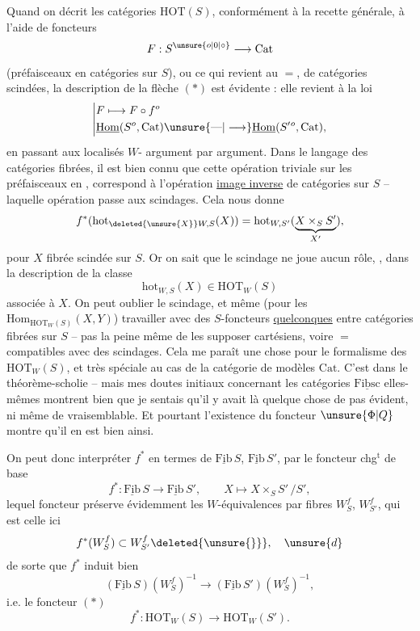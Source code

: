 Quand on décrit les catégories $\mathrm{HOT}(S)$, conformément à la recette générale, à l'aide de  foncteurs
\[
F:S^{\unsure{o|0|\circ}}\longrightarrow\mathrm{Cat}
\]
(préfaisceaux en catégories sur $S$), ou ce qui revient au $=$, de catégories scindées, la description de la  flèche $(*)$ est évidente : elle revient à la loi
\[
\left|\begin{aligned}
&F\longmapsto F\circ f^o\\
&\underline{\mathrm{Hom}}(S^o,\mathrm{Cat})\unsure{\text{---}|\longrightarrow}\underline{\mathrm{Hom}}(S'{}^o,\mathrm{Cat}),
\end{aligned}\right.
\]
en passant aux localisés  $W$- argument par argument. Dans le langage des catégories fibrées, il est bien connu que cette opération triviale sur les préfaisceaux en , correspond à l'opération \uline{image inverse} de catégories sur $S$ -- laquelle opération passe aux scindages.
Cela nous donne 
\[
f^*(\mathrm{hot}_{\deleted{\unsure{X}}W,S}(X))=\mathrm{hot}_{W,S'}(\underbrace{X\times_S S'}_{X'}),
\]
pour  $X$ fibrée scindée sur $S$. Or on sait que le scindage  ne joue aucun rôle, , dans la description de la classe
\[
\mathrm{hot}_{W,S}(X)\in\mathrm{HOT}_W(S)
\]
associée à $X$. On peut oublier le scindage, et même (pour  les $\mathrm{Hom}_{\mathrm{HOT}_W(S)}(X,Y)$) travailler avec des $S$-foncteurs \uline{quelconques} entre catégories fibrées sur $S$ -- pas la peine même de les supposer cartésiens, voire $=$ compatibles avec des scindages. Cela me paraît une chose   pour le formalisme des $\mathrm{HOT}_W(S)$, et très spéciale au cas  de la catégorie de modèles $\mathrm{Cat}$.
C'est   dans le théorème-scholie -- mais mes doutes initiaux concernant les catégories $\underline{\mathrm{Fibsc}}$ elles-mêmes montrent bien que je sentais qu'il y avait là quelque chose de pas évident, ni même  de vraisemblable. Et pourtant l'existence du foncteur $\unsure{\Phi|Q}$ montre qu'il en est bien ainsi.

On peut donc interpréter $f^*$ en termes de $\underline{\mathrm{Fib}}\,S$, $\underline{\mathrm{Fib}}\,S'$, par le foncteur chg$^{\mathrm t}$ de base
\[
f^*:\underline{\mathrm{Fib}}\,S\longrightarrow\underline{\mathrm{Fib}}\,S',\qquad X\longmapsto X\times_S S'\,/S',
\]
lequel foncteur préserve évidemment les $W$-équivalences par fibres $W_S^f$, $W_{S'}^f$, qui est celle  ici
\[
f^*(W_S^f)\subset W_{S'}^f\deleted{\unsure{\}}},\quad\unsure{d}
\]
de sorte que $f^*$ induit bien
\[
(\underline{\mathrm{Fib}}\,S)(W_S^f)^{-1}\longrightarrow(\underline{\mathrm{Fib}}\,S')(W_S^f)^{-1},
\]
i.e. le foncteur $(*)$
\[
f^*:\mathrm{HOT}_W(S)\longrightarrow\mathrm{HOT}_W(S').
\]

